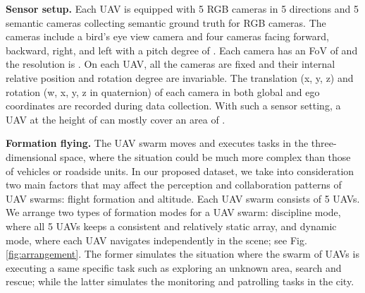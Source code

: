 \documentclass{article}
\begin{document}
\textbf{Sensor setup.}
Each UAV is equipped with 5 RGB cameras in 5 directions and 5 semantic cameras collecting semantic ground truth for RGB cameras. The cameras include a bird's eye view camera and four cameras facing forward, backward, right, and left with a pitch degree of . Each camera has an FoV of  and the resolution is . On each UAV, all the cameras are fixed and their internal relative position and rotation degree are invariable. The translation (x, y, z) and rotation (w, x, y, z in quaternion) of each camera in both global and ego coordinates are recorded during data collection. With such a sensor setting, a UAV at the height of  can mostly cover an area of .



\textbf{Formation flying.}
The UAV swarm moves and executes tasks in the three-dimensional space, where the situation could be much more complex than those of vehicles or roadside units. In our proposed dataset, we take into consideration two main factors that may affect the perception and collaboration patterns of UAV swarms: flight formation and altitude. Each UAV swarm consists of 5 UAVs. We arrange two types of formation modes for a UAV swarm: discipline mode, where all 5 UAVs keeps a consistent and relatively static array, and dynamic mode, where each UAV navigates independently in the scene; see Fig. \ref{fig:arrangement}. The former simulates the situation where the swarm of UAVs is executing a same specific task such as exploring an unknown area, search and rescue; while the latter simulates the monitoring and patrolling tasks in the city. 
\end{document}
